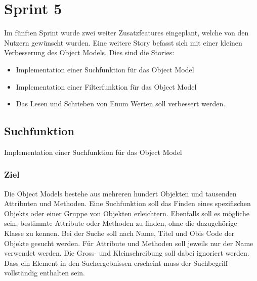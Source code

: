 \section{Sprint 5}
Im fünften Sprint wurde zwei weiter Zusatzfeatures eingeplant, welche von den Nutzern gewünscht wurden.
Eine weitere Story befasst sich mit einer kleinen Verbesserung des Object Models.
Dies sind die Stories:
\begin{itemize}
   \item Implementation einer Suchfunktion für das Object Model
   \item Implementation einer Filterfunktion für das Object Model
   \item Das Lesen und Schrieben von Enum Werten soll verbessert werden.
\end{itemize}

\subsection{Suchfunktion}
\dq Implementation einer Suchfunktion für das Object Model\dq
\subsubsection{Ziel}
Die Object Models bestehe aus mehreren hundert Objekten und tausenden Attributen und Methoden.
Eine Suchfunktion soll das Finden eines spezifischen Objekts oder einer Gruppe von Objekten erleichtern.
Ebenfalls soll es mögliche sein, bestimmte Attribute oder Methoden zu finden, ohne die dazugehörige Klasse zu kennen.
Bei der Suche soll nach Name, Titel und Obis Code der Objekte gesucht werden.
Für Attribute und Methoden soll jeweils nur der Name verwendet werden.
Die Gross- und Kleinschreibung soll dabei ignoriert werden.
Dass ein Element in den Suchergebnissen erscheint muss der Suchbegriff vollständig enthalten sein.

